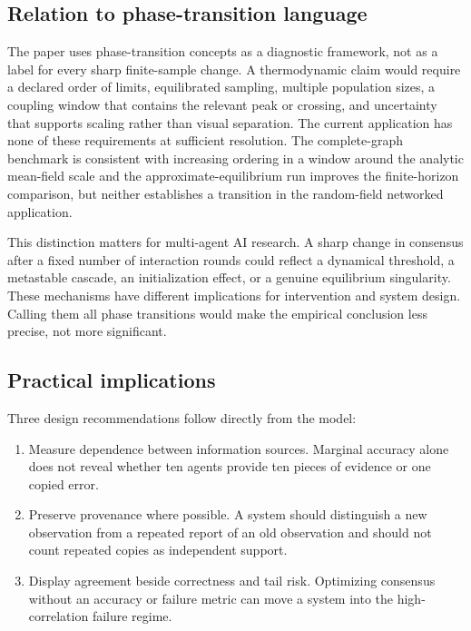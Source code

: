 \documentclass[11pt,a4paper]{article}
\begin{document}
\subsection{Relation to phase-transition language}

The paper uses phase-transition concepts as a diagnostic framework, not as a label for every sharp finite-sample change. A thermodynamic claim would require a declared order of limits, equilibrated sampling, multiple population sizes, a coupling window that contains the relevant peak or crossing, and uncertainty that supports scaling rather than visual separation. The current application has none of these requirements at sufficient resolution. The complete-graph benchmark is consistent with increasing ordering in a window around the analytic mean-field scale and the approximate-equilibrium run improves the finite-horizon comparison, but neither establishes a transition in the random-field networked application.

This distinction matters for multi-agent AI research. A sharp change in consensus after a fixed number of interaction rounds could reflect a dynamical threshold, a metastable cascade, an initialization effect, or a genuine equilibrium singularity. These mechanisms have different implications for intervention and system design. Calling them all phase transitions would make the empirical conclusion less precise, not more significant.

\subsection{Practical implications}

Three design recommendations follow directly from the model:

\begin{enumerate}
  \item Measure dependence between information sources. Marginal accuracy alone does not reveal whether ten agents provide ten pieces of evidence or one copied error.
  \item Preserve provenance where possible. A system should distinguish a new observation from a repeated report of an old observation and should not count repeated copies as independent support.
  \item Display agreement beside correctness and tail risk. Optimizing consensus without an accuracy or failure metric can move a system into the high-correlation failure regime.
\end{enumerate}
\end{document}
